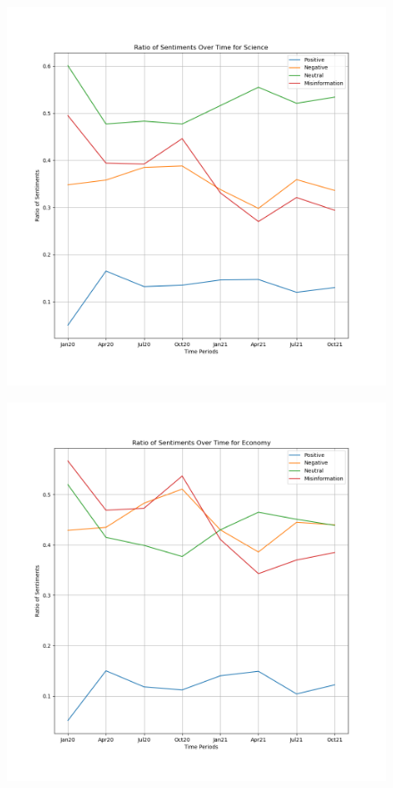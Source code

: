 \documentclass{l4proj}
\begin{document}
\begin{appendices}
\begin{figure}[H]
\begin{minipage}[c]{0.49\linewidth}
\label{fig:treatsen}
\end{minipage}
\end{figure}

\begin{figure}[H]
\begin{minipage}[c]{0.49\linewidth}
\centering
\includegraphics[width=\textwidth]{images/ScienceSentiment.png}
\label{fig:scisen}
\end{minipage}
\begin{minipage}[c]{0.49\linewidth}
\centering
\includegraphics[width=\textwidth]{images/EconomySentiment.png}

\end{minipage}
\end{figure}
\end{appendices}
\end{document}
